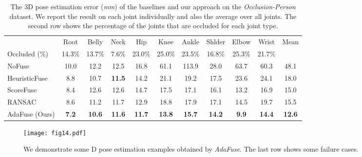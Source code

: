 \begin{table*}[]
\centering
\caption{The 3D pose estimation error (\textit{mm}) of the baselines and our approach on the \emph{Occlusion-Person} dataset. We report the result on each joint individually and also the average over all joints. The second row shows the percentage of the joints that are occluded for each joint type.}
\label{table:unreal_mpjpe}
\begin{tabular}{l|ccccccccc|c}
\toprule
        & Root & Belly & Neck  & Hip   & Knee  & Ankle  & Shlder   & Elbow   & Wrist   & Mean \\ 
        Occluded (\%) & 14.3\%	&13.7\%	&7.6\%	&23.0\%	&25.0\%	&23.5\%	& 16.8\%	&25.3\%	&21.7\% &\\ \hline
NoFuse           & 10.0 & 12.2 & 12.5 & 16.8 & 61.1 & 113.9 & 28.0 & 63.7 & 60.3 & 48.1 \\
HeuristicFuse    & 8.8  & 10.7 & \textbf{11.5} & 14.2 & 21.1 & 19.2  & 17.5 & 23.6 & 24.1 & 18.0 \\
ScoreFuse        & 8.4  & 12.6 & 12.6 & 14.7 & 17.5 & 17.1  & 16.1 & 13.2 & 16.9 & 15.0 \\
RANSAC           & 8.6  & 11.2 & 11.7 & 12.9 & 18.8 & 17.9  & 17.1 & 14.5 & 19.7 & 15.5 \\

AdaFuse (Ours) & \textbf{7.2}  & \textbf{10.6} & \textbf{11.6} & \textbf{11.7} & \textbf{13.8} & \textbf{15.7}  & \textbf{14.2} & \textbf{9.9}  & \textbf{14.4} & \textbf{12.6} \\
\toprule
\end{tabular}
\end{table*}


\begin{figure*}
    \centering
    \texttt{[image: fig14.pdf]}
    \caption{We demonstrate some D pose estimation examples obtained by \emph{AdaFuse}. The last row shows some failure cases. }
    \label{fig:qualitative}
\end{figure*}


